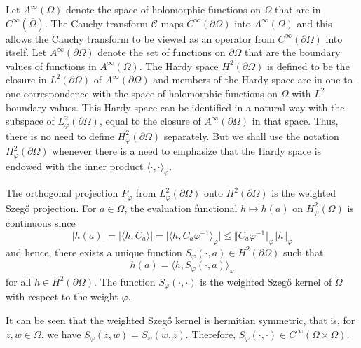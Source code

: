 \documentclass[11pt, reqno]{amsart}
\numberwithin{equation}{section}
\newcommand{\ov}{\overline}
\begin{document}
Let $A^{\infty}(\Omega)$ denote the space of holomorphic functions on $\Omega$ that are in $C^{\infty}(\ov{\Omega})$. The Cauchy transform $\mathcal C$ maps $C^{\infty}(\partial\Omega)$ into $A^{\infty}(\Omega)$  and this allows the Cauchy transform to be viewed as an operator from $C^{\infty}(\partial\Omega)$ into itself. Let $A^{\infty}(\partial\Omega)$ denote the set of functions on $\partial\Omega$ that are the boundary values of functions in $A^{\infty}(\Omega)$. The Hardy space $H^2(\partial\Omega)$ is defined to be the closure in $L^2(\partial\Omega)$ of $A^{\infty}(\partial\Omega)$ and members of the Hardy space are in one-to-one correspondence with the space of holomorphic functions on $\Omega$ with $L^2$ boundary values. This Hardy space can be identified in a natural way with the subspace of $L^2_{\varphi}(\partial\Omega)$, equal to the closure of $A^{\infty}(\partial\Omega)$ in that space. Thus, there is no need to define $H^2_{\varphi}(\partial\Omega)$ separately. But we shall use the notation $H^2_{\varphi}(\partial\Omega)$ whenever there is a need to emphasize that the Hardy space is endowed with the inner product $\langle \cdot,\cdot\rangle_{\varphi}$. 

\medskip

The orthogonal projection $P_{\varphi}$ from $L^2_{\varphi}(\partial\Omega)$ onto $H^2(\partial\Omega)$ is the weighted Szeg\H{o} projection. For $a\in\Omega$, the evaluation functional $h\mapsto h(a)$ on $H^2_{\varphi}(\Omega)$ is continuous since
\[
\vert h(a)\vert = \vert \langle h, C_a \rangle \vert = \vert \langle h, C_a \varphi^{-1}\rangle_{\varphi}\vert \leq \Vert C_a \varphi^{-1} \Vert_{\varphi} \Vert h\Vert_{\varphi}
\]
and hence, there exists a unique function $S_{\varphi}(\cdot,a)\in H^2(\partial\Omega)$ such that 
\begin{equation}
h(a)=\langle h, S_{\varphi}(\cdot, a)\rangle_{\varphi}
\end{equation}
for all $h\in H^2(\partial\Omega)$. The function $S_{\varphi}(\cdot,\cdot)$ is the weighted Szeg\H{o} kernel of $\Omega$ with respect to the weight $\varphi$. 

\medskip

It can be seen that the weighted Szeg\H{o} kernel is hermitian symmetric, that is, for $z, w\in\Omega$, we have
$
S_{\varphi}(z,w)= \overline{S_{\varphi}(w,z)}.
$
Therefore, $S_{\varphi}(\cdot,\cdot)\in C^{\infty}(\Omega\times\Omega)$. 

\medskip
\end{document}

